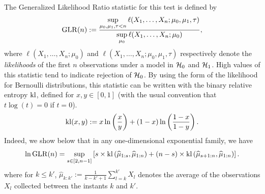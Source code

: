 The Generalized Likelihood Ratio statistic for this test is defined by
\begin{equation}\label{eq:6:firstDefGLRT}
    \mathrm{GLR}(n) :=\frac{\sup\limits_{\mu_0,\mu_1,\tau < n}\ell(X_1, \ldots, X_n ; \mu_0,\mu_1,\tau)}{\sup\limits_{\mu_0}\ell(X_1, \ldots, X_n ; \mu_0)},
\end{equation}
%
where $\ell(X_1, \ldots, X_n ; \mu_0)$ and $\ell(X_1, \ldots, X_n ; \mu_0,\mu_1,\tau)$ respectively denote the \emph{likelihoods} of the first $n$ observations under a model in $\mathcal{H}_0$ and $\mathcal{H}_1$.
High values of this statistic tend to indicate rejection of $\mathcal{H}_0$.
%
By using the form of the likelihood for Bernoulli distributions, this statistic can be written with the binary relative entropy $\mathrm{kl}$, defined for $x,y\in[0,1]$ (with the usual convention that $t \log(t) = 0$ if $t=0$).
%
\begin{equation}\label{eq:6:BernoulliDivergence}
    \mathrm{kl}(x,y) := x \ln\left(\frac{x}{y}\right) + (1-x)\ln\left(\frac{1-x}{1-y}\right).
\end{equation}
%
Indeed, we show below
that in any one-dimensional exponential family, we have
\begin{equation}\label{eq:6:secondDefGLRT}
    \ln \mathrm{GLR}(n) = \sup_{s \in [2,n-1]} \left[s \times \mathrm{kl}\left(\widehat{\mu}_{1:s},\widehat{\mu}_{1:n}\right) + (n-s) \times \mathrm{kl}\left(\widehat{\mu}_{s+1:n},\widehat{\mu}_{1:n}\right)\right].
\end{equation}
%
where for $k \leq k'$, $\widehat{\mu}_{k:k'} := \frac{1}{k - k' + 1} \sum_{l=k}^{k'} X_l$ denotes the average of the observations $X_l$ collected between the instants $k$ and $k'$.


